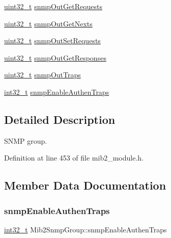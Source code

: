 \begin{DoxyCompactItemize}
\item 
\hyperlink{stdint_8h_a435d1572bf3f880d55459d9805097f62}{uint32\+\_\+t} \hyperlink{structMib2SnmpGroup_aa4a9e2f367a745e2f4e73922e13c5238}{snmp\+Out\+Get\+Requests}
\item 
\hyperlink{stdint_8h_a435d1572bf3f880d55459d9805097f62}{uint32\+\_\+t} \hyperlink{structMib2SnmpGroup_a49c784966b0d8836d01042a1e939b28b}{snmp\+Out\+Get\+Nexts}
\item 
\hyperlink{stdint_8h_a435d1572bf3f880d55459d9805097f62}{uint32\+\_\+t} \hyperlink{structMib2SnmpGroup_a85420591eb733e88cbb166df148109fd}{snmp\+Out\+Set\+Requests}
\item 
\hyperlink{stdint_8h_a435d1572bf3f880d55459d9805097f62}{uint32\+\_\+t} \hyperlink{structMib2SnmpGroup_aeabd9ab6b12c378ae4b7f58796e40ed8}{snmp\+Out\+Get\+Responses}
\item 
\hyperlink{stdint_8h_a435d1572bf3f880d55459d9805097f62}{uint32\+\_\+t} \hyperlink{structMib2SnmpGroup_ad44099b39ba4cae53deb6fff101beaf7}{snmp\+Out\+Traps}
\item 
\hyperlink{stdint_8h_ab1967d8591af1a4e48c37fd2b0f184d0}{int32\+\_\+t} \hyperlink{structMib2SnmpGroup_a8b25fcccb9bd52b1a386eb2d2020ccb4}{snmp\+Enable\+Authen\+Traps}
\end{DoxyCompactItemize}


\subsection{Detailed Description}
S\+N\+MP group. 

Definition at line 453 of file mib2\+\_\+module.\+h.



\subsection{Member Data Documentation}
\mbox{\label{structMib2SnmpGroup_a8b25fcccb9bd52b1a386eb2d2020ccb4}} 
\subsubsection{\texorpdfstring{snmp\+Enable\+Authen\+Traps}{snmpEnableAuthenTraps}}
{\footnotesize\ttfamily \hyperlink{stdint_8h_ab1967d8591af1a4e48c37fd2b0f184d0}{int32\+\_\+t} Mib2\+Snmp\+Group\+::snmp\+Enable\+Authen\+Traps}



